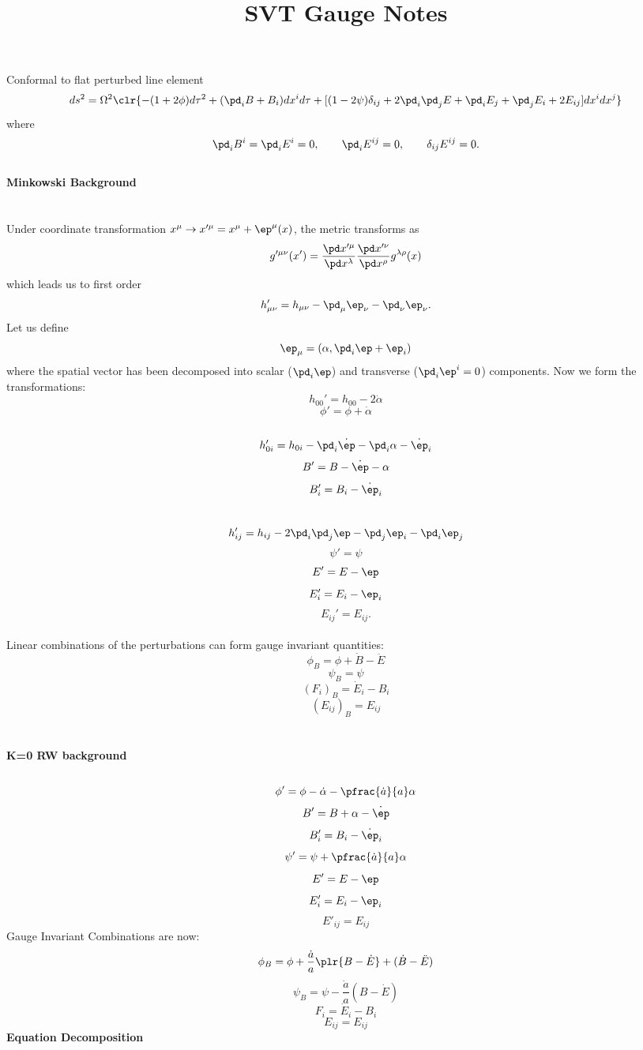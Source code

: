 \documentclass[10pt,letterpaper]{article}
\title{SVT Gauge Notes}
\author{}
\date{}
\begin{document}
\maketitle
\noindent Conformal to flat perturbed line element
\[
	ds^2 = \Omega^2\clr{ -(1+2\phi)d\tau^2 + (\pd_i B+B_i)dx^id\tau + [(1-2\psi)\delta_{ij}+2\pd_i\pd_j E + \pd_i E_j+\pd_j E_i + 2E_{ij}]dx^i dx^j}
\]
where
\[
	\pd_i B^i = \pd_i E^i = 0,\qquad \pd_i E^{ij} = 0,\qquad \delta_{ij}E^{ij} = 0.
\]
\
\\
\textbf{Minkowski Background}
\\ \\
\\
Under coordinate transformation $x^\mu \to x'^\mu = x^\mu + \ep^\mu(x)$, the metric transforms as
\[
	g'^{\mu\nu}(x') = \frac{\pd x'^\mu}{\pd x^\lambda}\frac{\pd x'^\nu}{\pd x^\rho} g^{\lambda\rho}(x)
\]
which leads us to first order
\[
	h'_{\mu\nu} = h_{\mu\nu} - \pd_\mu \ep_\nu -\pd_\nu \ep_\nu.
\]
Let us define 
\[
	\ep_\mu = (\alpha, \pd_i \ep + \ep_i)
\]
where the spatial vector has been decomposed into scalar ($\pd_i \ep$) and transverse ($\pd_i \ep^i = 0$) components. Now we form the transformations:
\[
	h_{00}' = h_{00} -2\dot\alpha
\]
\[
	\phi' = \phi +\dot\alpha
\]
\\
\[
	h_{0i}' = h_{0i} - \pd_i \dot\ep - \pd_i \alpha - \dot \ep_i
\]
\[
	B' = B -\dot\ep - \alpha
\]
\[
	B_i' = B_i - \dot \ep_i
\]
\\
\[
	h_{ij}' = h_{ij} -2\pd_i \pd_j \ep - \pd_j \ep_i-\pd_i\ep_j
\]
\[
	\psi' = \psi
\]
\[
	E' = E -\ep
\]
\[
	E_i' = E_i - \ep_i
\]
\[
	E_{ij}' = E_{ij}.
\]
\\
Linear combinations of the perturbations can form gauge invariant quantities:
\[
	\phi_B = \phi + \dot B - \ddot E
\]
\[
	\psi_B = \psi
\]
\[
	(F_i)_B = \dot E_i - B_i
\]
\[
	(E_{ij})_B = E_{ij}
\]
\\ \\
\textbf{K=0 RW background} \\ \\
\[
	\phi' = \phi - \dot\alpha - \pfrac{\dot a}{a}\alpha
\]
\[
	B' = B + \alpha - \dot \ep
\]
\[
	B'_i = B_i - \dot \ep_i
\]
\[
	\psi' = \psi + \pfrac{\dot a}{a}\alpha
\]
\[
	E' = E-\ep
\]
\[ 
	E'_i = E_i - \ep_i
\]
\[ 
	E'_{ij} = E_{ij}
\]
Gauge Invariant Combinations are now:
\[
	\phi_B = \phi + \frac{\dot a}{a}\plr{ B-\dot E} + (\dot B - \ddot E)
\]
\[
	\psi_B = \psi - \frac{\dot a}{a}(B-\dot E)
\]
\[
	F_i = \dot E_i - B_i
\]
\[
	E_{ij} = E_{ij}
\]
\textbf{Equation Decomposition}\\ \\
\end{document}
